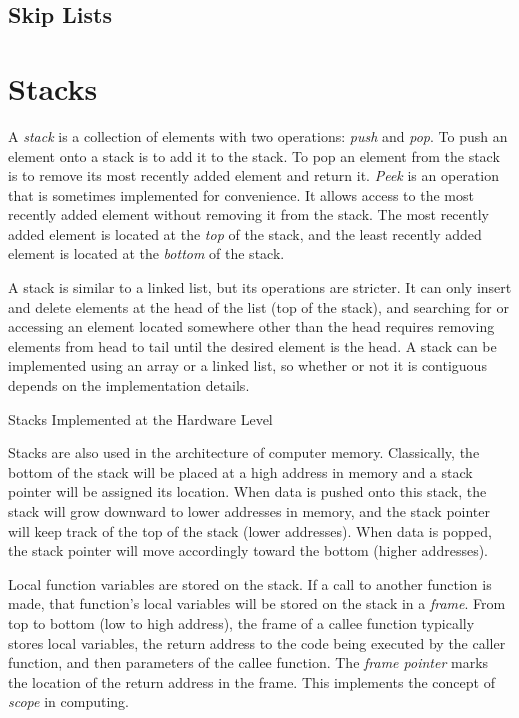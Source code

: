 \subsection{Skip Lists}

\section{Stacks}

A \textit{stack} is a collection of elements with two operations: \textit{push} and \textit{pop}. To push an element onto a stack is to add it to the stack. To pop an element from the stack is to remove its most recently added element and return it. \textit{Peek} is an operation that is sometimes implemented for convenience. It allows access to the most recently added element without removing it from the stack. The most recently added element is located at the \textit{top} of the stack, and the least recently added element is located at the \textit{bottom} of the stack.

A stack is similar to a linked list, but its operations are stricter. It can only insert and delete elements at the head of the list (top of the stack), and searching for or accessing an element located somewhere other than the head requires removing elements from head to tail until the desired element is the head. A stack can be implemented using an array or a linked list, so whether or not it is contiguous depends on the implementation details.

\begin{bluebox}{Stacks Implemented at the Hardware Level}

    Stacks are also used in the architecture of computer memory. Classically, the bottom of the stack will be placed at a high address in memory and a stack pointer will be assigned its location. When data is pushed onto this stack, the stack will grow downward to lower addresses in memory, and the stack pointer will keep track of the top of the stack (lower addresses). When data is popped, the stack pointer will move accordingly toward the bottom (higher addresses).
    
    Local function variables are stored on the stack. If a call to another function is made, that function's local variables will be stored on the stack in a \textit{frame}. From top to bottom (low to high address), the frame of a callee function typically stores local variables, the return address to the code being executed by the caller function, and then parameters of the callee function. The \textit{frame pointer} marks the location of the return address in the frame. This implements the concept of \textit{scope} in computing.

\end{bluebox}

